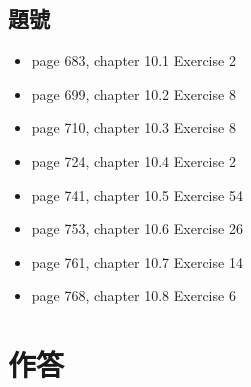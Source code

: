 \documentclass[sigconf]{acmart}
\begin{document}
\subsection{題號}
\begin{shaded}
    \begin{itemize}
    \item[-] page 683, chapter 10.1 Exercise 2
    \item[-] page 699, chapter 10.2 Exercise 8
    \item[-] page 710, chapter 10.3 Exercise 8
    \item[-] page 724, chapter 10.4 Exercise 2
    \item[-] page 741, chapter 10.5 Exercise 54
    \item[-] page 753, chapter 10.6 Exercise 26
    \item[-] page 761, chapter 10.7 Exercise 14
    \item[-] page 768, chapter 10.8 Exercise 6
\end{itemize}
\end{shaded}


\section{作答}
\end{document}
